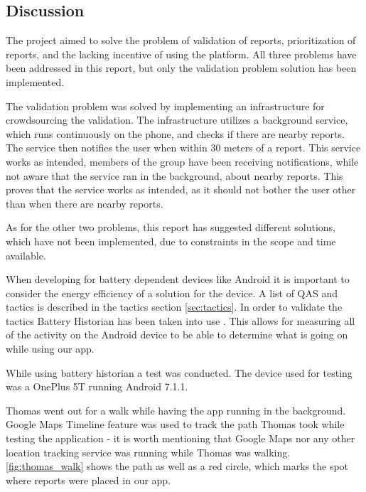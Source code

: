 \subsection{Discussion}

The project aimed to solve the problem of validation of reports, prioritization of reports, and the lacking incentive of using the platform. All three problems have been addressed in this report, but only the validation problem solution has been implemented.

The validation problem was solved by implementing an infrastructure for crowdsourcing the validation. The infrastructure utilizes a background service, which runs continuously on the phone, and checks if there are nearby reports. The service then notifies the user when within 30 meters of a report. 
This service works as intended, members of the group have been receiving notifications, while not aware that the service ran in the background, about nearby reports. This proves that the service works as intended, as it should not bother the user other than when there are nearby reports.

As for the other two problems, this report has suggested different solutions, which have not been implemented, due to constraints in the scope and time available.

When developing for battery dependent devices like Android it is important to consider the energy efficiency of a solution for the device. A list of QAS and tactics is described in the tactics section \ref{sec:tactics}. In order to validate the tactics Battery Historian has been taken into use \cite{bathist}. This allows for measuring all of the activity on the Android device to be able to determine what is going on while using our app. 

While using battery historian a test was conducted. The device used for testing was a OnePlus 5T running Android 7.1.1. 

Thomas went out for a walk while having the app running in the background. Google Maps Timeline feature was used to track the path Thomas took while testing the application - it is worth mentioning that Google Maps nor any other location tracking service was running while Thomas was walking. \autoref{fig:thomas_walk} shows the path as well as a red circle, which marks the spot where reports were placed in our app.

